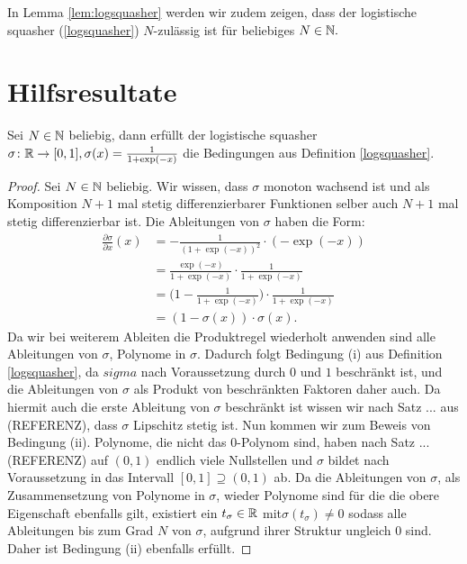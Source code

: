 In Lemma \ref{lem:logsquasher} werden wir zudem zeigen, dass der logistische squasher (\ref{logsquasher}) $N$-zulässig ist für beliebiges $N \in \mathbb{N}.$ 

\section{Hilfsresultate}
\begin{lem}
\label{lem:logsquasher}
Sei $N \in \mathbb{N}$ beliebig, dann erfüllt der logistische squasher $\sigma\colon \mathbb{R} \to [0, 1], \sigma(x) = \frac{1}{1 + \exp(-x)}$ die Bedingungen aus Definition \ref{logsquasher}.  
\end{lem}
\begin{proof}
Sei $N \in \mathbb{N}$ beliebig. Wir wissen, dass $\sigma$ monoton wachsend ist und als Komposition $N + 1$ mal stetig differenzierbarer Funktionen selber auch $N + 1$ mal stetig differenzierbar ist. Die Ableitungen von $\sigma$ haben die Form$\colon$
\begin{equation*}
\begin{split}
\frac{\partial \sigma}{\partial x}(x) &= -\frac{1}{(1 + \exp(-x))^2} \cdot (-\exp(-x)) \\
& = \frac{\exp(-x)}{1 + \exp(-x)} \cdot \frac{1}{1 + \exp(-x)} \\
& = \bigg(1 - \frac{1}{1 + \exp(-x)}\bigg) \cdot \frac{1}{1 + \exp(-x)} \\
& = (1 - \sigma(x)) \cdot \sigma(x).
\end{split}
\end{equation*}
Da wir bei weiterem Ableiten die Produktregel wiederholt anwenden sind alle Ableitungen von $\sigma$, Polynome in $\sigma$. Dadurch folgt Bedingung (i) aus Definition \ref{logsquasher}, da $sigma$ nach Voraussetzung durch $0$ und $1$ beschränkt ist, und die Ableitungen von $\sigma$ als Produkt von beschränkten Faktoren daher auch. Da hiermit auch die erste Ableitung von $\sigma$ beschränkt ist wissen wir nach Satz ... aus (REFERENZ), dass $\sigma$ Lipschitz stetig ist.
Nun kommen wir zum Beweis von Bedingung (ii). Polynome, die nicht das $0$-Polynom sind, haben nach Satz ... (REFERENZ) auf $(0, 1)$ endlich viele Nullstellen und $\sigma$ bildet nach Voraussetzung in das Intervall $[0, 1] \supseteq (0, 1)$ ab. Da die Ableitungen von $\sigma$, als Zusammensetzung von Polynome in $\sigma$, wieder Polynome sind für die die obere Eigenschaft ebenfalls gilt, existiert ein $t_{\sigma} \in \mathbb{R}$ mit$\sigma(t_{\sigma}) \neq 0$ sodass alle Ableitungen bis zum Grad $N$ von $\sigma$, aufgrund ihrer Struktur ungleich $0$ sind. Daher ist Bedingung (ii) ebenfalls erfüllt.

\end{proof}
